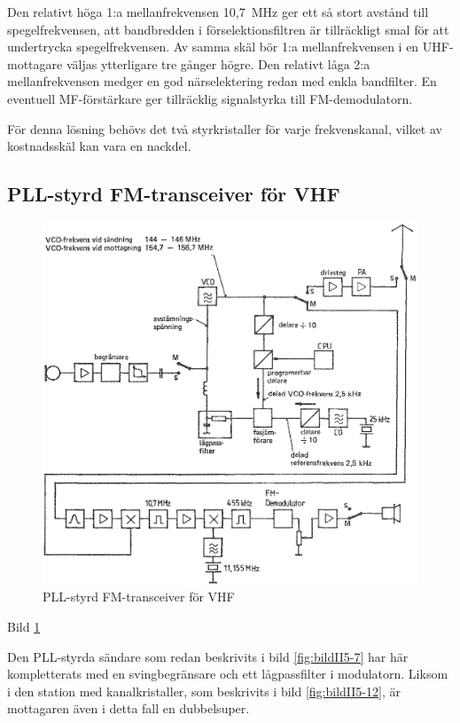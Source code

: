 Den relativt höga 1:a mellanfrekvensen 10,7~MHz ger ett så stort
avstånd till spegelfrekvensen, att bandbredden i förselektionsfiltren
är tillräckligt smal för att undertrycka spegelfrekvensen. Av samma
skäl bör 1:a mellanfrekvensen i en UHF-mottagare väljas ytterligare
tre gånger högre. Den relativt låga 2:a mellanfrekvensen medger en god
närselektering redan med enkla bandfilter. En eventuell
MF-förstärkare ger tillräcklig signalstyrka till FM-demodulatorn.

För denna lösning behövs det två styrkristaller för varje
frekvenskanal, vilket av kostnadsskäl kan vara en nackdel.

\subsection{PLL-styrd FM-transceiver för VHF}

\begin{figure}
  \includegraphics[width=\textwidth]{images/bild_2_5-13.png}
  \caption{PLL-styrd FM-transceiver för VHF}
  \label{fig:bildII5-13}
\end{figure}

Bild \ref{fig:bildII5-13}

Den PLL-styrda sändare som redan beskrivits i bild \ref{fig:bildII5-7} har här
kompletterats med en svingbegränsare och ett lågpassfilter i
modulatorn. Liksom i den station med kanalkristaller, som beskrivits i
bild \ref{fig:bildII5-12}, är mottagaren även i detta fall en dubbelsuper.

